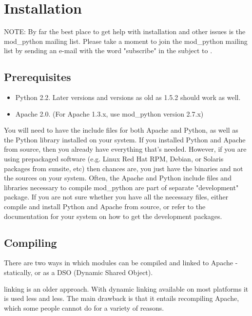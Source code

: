 \chapter{Installation\label{installation}}
NOTE: By far the best place to get help with installation and other
issues is the mod_python mailing list. Please take a moment to join
the mod_python mailing list by sending an e-mail with the word
"subscribe" in the subject to .

\section{Prerequisites\label{inst-prerequisites}}

\begin{itemize}
\item
Python 2.2. Later versions and versions as old as 1.5.2 should work as well.
\item
Apache 2.0. (For Apache 1.3.x, use mod_python version 2.7.x)
\end{itemize}

You will need to have the include files for both Apache and Python, as
well as the Python library installed on your system.  If you installed
Python and Apache from source, then you already have everything that's
needed. However, if you are using prepackaged software (e.g. Linux Red
Hat RPM, Debian, or Solaris packages from sunsite, etc) then chances
are, you just have the binaries and not the sources on your
system. Often, the Apache and Python include files and libraries
necessary to compile mod_python are part of separate "development"
package. If you are not sure whether you have all the necessary files,
either compile and install Python and Apache from source, or refer to
the documentation for your system on how to get the development
packages.

\section{Compiling\label{inst-compiling}}

There are two ways in which modules can be compiled and linked to
Apache - statically, or as a DSO (Dynamic Shared Object).

 linking is an older approach. With dynamic linking
available on most platforms it is used less and less. The main
drawback is that it entails recompiling Apache, which some people
cannot do for a variety of reasons.

